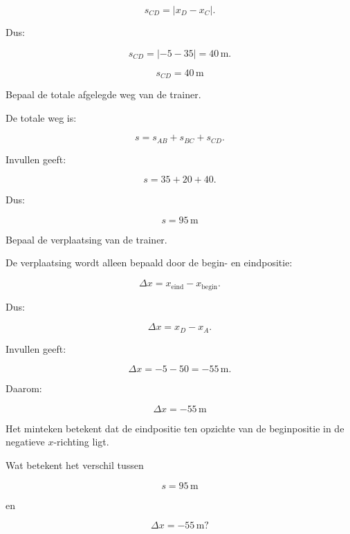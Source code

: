 \documentclass{ximera}
\begin{document}
\begin{oefening}{\oefU}
\begin{question}
\begin{oplossing}
  \[
  s_{CD}
  =
  |x_D-x_C|.
  \]
  
  Dus:
  
  \[
  s_{CD}
  =
  |-5-35|
  =
  40\,\mathrm{m}.
  \]
  
  \[
  \boxed{s_{CD}=40\,\mathrm{m}}
  \]
  \end{oplossing}
  \end{question}
  
  
  \begin{question}
  Bepaal de totale afgelegde weg van de trainer.
  
  \begin{oplossing}
  De totale weg is:
  
  \[
  s
  =
  s_{AB}+s_{BC}+s_{CD}.
  \]
  
  Invullen geeft:
  
  \[
  s
  =
  35+20+40.
  \]
  
  Dus:
  
  \[
  \boxed{s=95\,\mathrm{m}}
  \]
  \end{oplossing}
  \end{question}
  
  
  \begin{question}
  Bepaal de verplaatsing van de trainer.
  
  \begin{oplossing}
  De verplaatsing wordt alleen bepaald door de begin- en eindpositie:
  
  \[
  \Delta x
  =
  x_{\text{eind}}
  -
  x_{\text{begin}}.
  \]
  
  Dus:
  
  \[
  \Delta x
  =
  x_D-x_A.
  \]
  
  Invullen geeft:
  
  \[
  \Delta x
  =
  -5-50
  =
  -55\,\mathrm{m}.
  \]
  
  Daarom:
  
  \[
  \boxed{\Delta x=-55\,\mathrm{m}}
  \]
  
  Het minteken betekent dat de eindpositie ten opzichte van de beginpositie in
  de negatieve $x$-richting ligt.
  \end{oplossing}
  \end{question}
  
  
  \begin{question}
  Wat betekent het verschil tussen
  
  \[
  s=95\,\mathrm{m}
  \]
  
  en
  
  \[
  \Delta x=-55\,\mathrm{m}?
  \]
  

\end{question}
\end{oefening}
\end{document}
